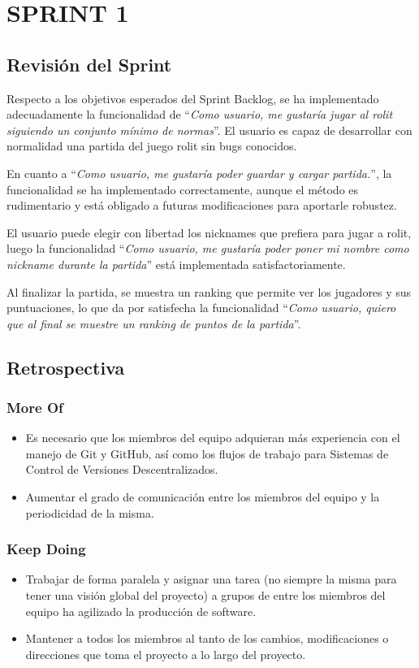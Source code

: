 \documentclass[../../FINAL/Scrum/SCRUM.tex]{subfiles}
\begin{document}
\section{SPRINT 1}
\subsection{Revisión del Sprint}
Respecto a los objetivos esperados del Sprint Backlog, se ha implementado adecuadamente la funcionalidad de ``\textit{Como usuario, me gustaría jugar al rolit siguiendo un conjunto mínimo de normas}''. El usuario es capaz de desarrollar con normalidad una partida del juego rolit sin bugs  conocidos.

En cuanto a ``\textit{Como usuario, me gustaría poder guardar y cargar partida.}'', la funcionalidad se ha implementado correctamente, aunque el método es rudimentario y está obligado a futuras modificaciones para aportarle robustez.

El usuario puede elegir con libertad los nicknames que prefiera para jugar a rolit, luego la funcionalidad ``\textit{Como usuario, me gustaría poder poner mi nombre como nickname durante la partida}'' está implementada satisfactoriamente.

Al finalizar la partida, se muestra un ranking que permite ver los jugadores y sus puntuaciones, lo que da por satisfecha la funcionalidad ``\textit{Como usuario, quiero que al final se muestre un ranking de puntos de la partida}''.

\subsection{Retrospectiva}
\subsubsection*{More Of}
\begin{itemize}
\item Es necesario que los miembros del equipo adquieran más experiencia con el manejo de Git y GitHub, así como los flujos de trabajo para Sistemas de Control de Versiones Descentralizados.

\item Aumentar el grado de comunicación entre los miembros del equipo y la periodicidad de la misma.

\end{itemize}
\subsubsection*{Keep Doing}
\begin{itemize}
\item Trabajar de forma paralela y asignar una tarea (no siempre la misma para tener una visión global del proyecto) a grupos de entre los miembros del equipo ha agilizado la producción de software.

\item Mantener a todos los miembros al tanto de los cambios, modificaciones o direcciones que toma el proyecto a lo largo del proyecto.
\end{itemize}
\end{document}
